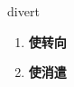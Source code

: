 
\begin{frame}
{\huge divert}
\begin{center}
\begin{enumerate}\Large
  \item \textbf{使转向}
  \item \textbf{使消遣}
\end{enumerate}
\end{center}
\end{frame}
